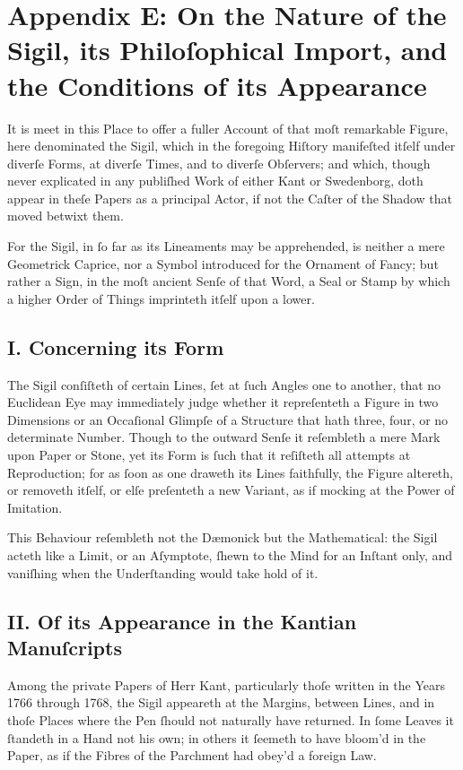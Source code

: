 \documentclass[12pt]{article}
\begin{document}
\newpage

\section*{Appendix E: On the Nature of the Sigil, its Philoſophical Import, and the Conditions of its Appearance}

It is meet in this Place to offer a fuller Account of that moſt remarkable 
Figure, here denominated the Sigil, which in the foregoing Hiſtory 
manifeſted itſelf under diverſe Forms, at diverſe Times, and to diverſe 
Obſervers; and which, though never explicated in any publiſhed Work of 
either Kant or Swedenborg, doth appear in theſe Papers as a principal Actor, 
if not the Caſter of the Shadow that moved betwixt them.

For the Sigil, in ſo far as its Lineaments may be apprehended, is neither a 
mere Geometrick Caprice, nor a Symbol introduced for the Ornament of Fancy; 
but rather a Sign, in the moſt ancient Senſe of that Word, a Seal or Stamp 
by which a higher Order of Things imprinteth itſelf upon a lower.

\subsection*{I. Concerning its Form}
The Sigil conſiſteth of certain Lines, ſet at ſuch Angles one to another, 
that no Euclidean Eye may immediately judge whether it repreſenteth a Figure 
in two Dimensions or an Occaſional Glimpſe of a Structure that hath three, 
four, or no determinate Number. Though to the outward Senſe it reſembleth a 
mere Mark upon Paper or Stone, yet its Form is ſuch that it reſiſteth all 
attempts at Reproduction; for as ſoon as one draweth its Lines faithfully, 
the Figure altereth, or removeth itſelf, or elſe preſenteth a new Variant, 
as if mocking at the Power of Imitation.

This Behaviour reſembleth not the Dæmonick but the Mathematical: the Sigil 
acteth like a Limit, or an Aſymptote, ſhewn to the Mind for an Inſtant only, 
and vaniſhing when the Underſtanding would take hold of it.

\subsection*{II. Of its Appearance in the Kantian Manuſcripts}
Among the private Papers of Herr Kant, particularly thoſe written in the 
Years 1766 through 1768, the Sigil appeareth at the Margins, between Lines, 
and in thoſe Places where the Pen ſhould not naturally have returned. In 
ſome Leaves it ſtandeth in a Hand not his own; in others it ſeemeth to have 
bloom’d in the Paper, as if the Fibres of the Parchment had obey’d a foreign 
Law.
\end{document}
